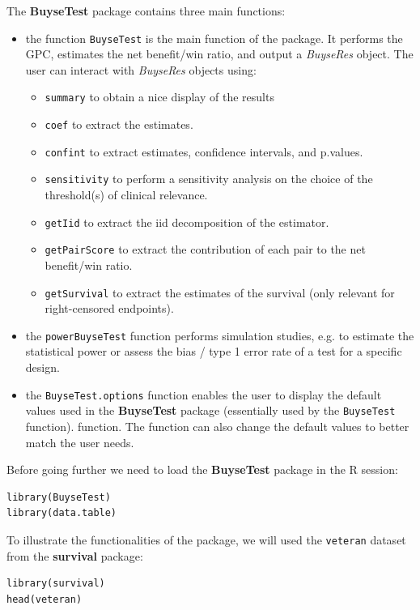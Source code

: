 \documentclass[12pt]{article}
\begin{document}
The \textbf{BuyseTest} package contains three main functions:
\begin{itemize}
\item the function \texttt{BuyseTest} is the main function of the package. It
performs the GPC, estimates the net benefit/win ratio, and output a
\emph{BuyseRes} object. The user can interact with \emph{BuyseRes} objects using:
\begin{itemize}
\item \texttt{summary} to obtain a nice display of the results
\item \texttt{coef} to extract the estimates.
\item \texttt{confint} to extract estimates, confidence intervals, and p.values.
\item \texttt{sensitivity} to perform a sensitivity analysis on the choice of the threshold(s) of clinical relevance.
\item \texttt{getIid} to extract the iid decomposition of the estimator.
\item \texttt{getPairScore} to extract the contribution of each pair to the net benefit/win ratio.
\item \texttt{getSurvival} to extract the estimates of the survival (only relevant for right-censored endpoints).
\end{itemize}
\item the \texttt{powerBuyseTest} function performs simulation studies,
e.g. to estimate the statistical power or assess the bias / type 1
error rate of a test for a specific design.
\item the \texttt{BuyseTest.options} function enables the user to display the
default values used in the \textbf{BuyseTest} package (essentially used by
the \texttt{BuyseTest} function). function. The function can also change
the default values to better match the user needs.
\end{itemize}

\clearpage

Before going further we need to load the \textbf{BuyseTest} package in the R
session:
\lstset{language=r,label= ,caption= ,captionpos=b,numbers=none}
\begin{lstlisting}
library(BuyseTest)
library(data.table)
\end{lstlisting}

To illustrate the functionalities of the package, we will used the
\texttt{veteran} dataset from the \textbf{survival} package:
\lstset{language=r,label= ,caption= ,captionpos=b,numbers=none}
\begin{lstlisting}
library(survival)
head(veteran)
\end{lstlisting}
\end{document}
